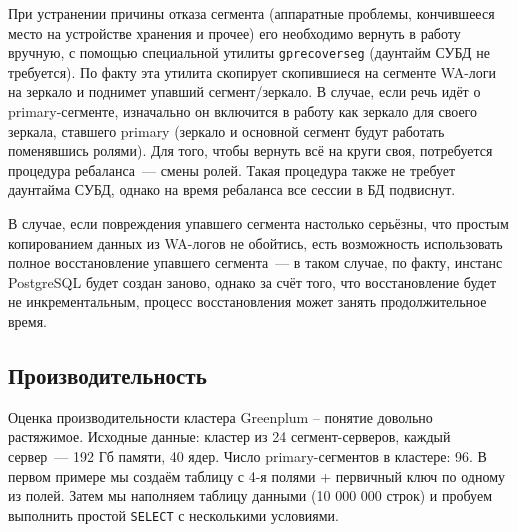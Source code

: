 При устранении причины отказа сегмента (аппаратные проблемы, кончившееся место на устройстве хранения и прочее) его необходимо вернуть в работу вручную, с помощью специальной утилиты \lstinline!gprecoverseg! (даунтайм СУБД не требуется). По факту эта утилита скопирует скопившиеся на сегменте WA-логи на зеркало и поднимет упавший сегмент/зеркало. В случае, если речь идёт о primary-сегменте, изначально он включится в работу как зеркало для своего зеркала, ставшего primary (зеркало и основной сегмент будут работать поменявшись ролями). Для того, чтобы вернуть всё на круги своя, потребуется процедура ребаланса~--- смены ролей. Такая процедура также не требует даунтайма СУБД, однако на время ребаланса все сессии в БД подвиснут.

В случае, если повреждения упавшего сегмента настолько серьёзны, что простым копированием данных из WA-логов не обойтись, есть возможность использовать полное восстановление упавшего сегмента~--- в таком случае, по факту, инстанс PostgreSQL будет создан заново, однако за счёт того, что восстановление будет не инкрементальным, процесс восстановления может занять продолжительное время.


\subsection{Производительность}

Оценка производительности кластера Greenplum – понятие довольно растяжимое. Исходные данные: кластер из 24 сегмент-серверов, каждый сервер~--- 192 Гб памяти, 40 ядер. Число primary-сегментов в кластере: 96. В первом примере мы создаём таблицу с 4-я полями + первичный ключ по одному из полей. Затем мы наполняем таблицу данными (10 000 000 строк) и пробуем выполнить простой \lstinline!SELECT! с несколькими условиями.

